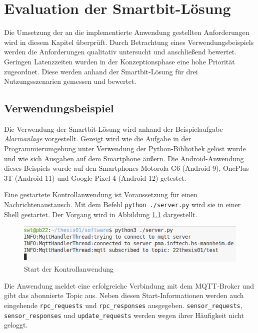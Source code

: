 \documentclass[11pt,a4paper]{report}
\begin{document}
\chapter{Evaluation der Smartbit-Lösung}\label{chap:eval}
Die Umsetzung der an die implementierte Anwendung gestellten Anforderungen wird in diesem Kapitel überprüft.
Durch Betrachtung eines Verwendungsbeispiels werden die Anforderungen qualitativ untersucht und anschließend bewertet.
Geringen Latenzzeiten wurden in der Konzeptionsphase eine hohe Priorität zugeordnet.
Diese werden anhand der Smartbit-Lösung für drei Nutzungsszenarien gemessen und bewertet.

\section{Verwendungsbeispiel}
Die Verwendung der Smartbit-Lösung wird anhand der Beispielaufgabe \textit{Alarmanlage} vorgestellt.
Gezeigt wird wie die Aufgabe in der Programmierumgebung unter Verwendung der Python-Bibliothek gelöst wurde und wie sich Ausgaben auf dem Smartphone äußern.
Die Android-Anwendung dieses Beispiels wurde auf den Smartphones Motorola G6 (Android 9), OnePlus 3T (Android 11) und Google Pixel 4 (Android 12) getestet.

Eine gestartete Kontrollanwendung ist Voraussetzung für einen Nachrichtenaustausch.
Mit dem Befehl \texttt{python ./server.py} wird sie in einer Shell gestartet.
Der Vorgang wird in Abbildung \ref{fig:start_controll_app} dargestellt.
\begin{figure}[htbp]
  \centering
  \includegraphics[width=.8\textwidth]{images/server_logging}
  \caption{Start der Kontrollanwendung}
  \label{fig:start_controll_app}
\end{figure}
Die Anwendung meldet eine erfolgreiche Verbindung mit dem MQTT-Broker und gibt das abonnierte Topic aus.
Neben diesen Start-Informationen werden auch eingehende \texttt{rpc\_requests} und \texttt{rpc\_responses} ausgegeben.
\texttt{sensor\_requests}, \texttt{sensor\_responses} und \texttt{update\_requests} werden wegen ihrer Häufigkeit nicht geloggt.
\end{document}
